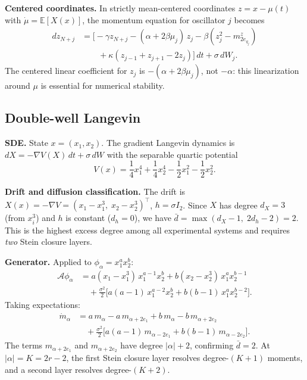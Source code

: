 \documentclass{article}
\newcommand{\E}{\mathbb{E}}
\theoremstyle{definition}
\begin{document}
\textbf{Centered coordinates.}
In strictly mean-centered coordinates $z=x-\mu(t)$ with
$\dot{\mu}=\E[X(x)]$,
the momentum equation for oscillator $j$ becomes
\begin{align}
    dz_{N+j} &= \bigl[-\gamma z_{N+j}
                - (\alpha + 2\beta\mu_j)\, z_j
                - \beta (z_j^2 - m^z_{2e_{q_j}})
    \nonumber\\
    &\quad\quad
                + \kappa(z_{j-1} + z_{j+1} - 2z_j)\bigr]\, dt
                + \sigma\, dW_j.
\end{align}
The centered linear coefficient for $z_j$ is
$-(\alpha + 2\beta\mu_j)$, not $-\alpha$:
this linearization around $\mu$ is essential for numerical stability.

\subsection{Double-well Langevin}
\label{app:double-well-generator}

\textbf{SDE.}
State $x = (x_1, x_2)$.
The gradient Langevin dynamics is
$dX = -\nabla V(X)\,dt + \sigma\,dW$
with the separable quartic potential
\begin{equation}\label{eq:double-well-potential}
    V(x) = \frac{1}{4}x_1^4 + \frac{1}{4}x_2^4
         - \frac{1}{2}x_1^2 - \frac{1}{2}x_2^2.
\end{equation}

\textbf{Drift and diffusion classification.}
The drift is
$X(x) = -\nabla V = (x_1 - x_1^3,\; x_2 - x_2^3)^\top$,
$h = \sigma I_2$.
Since $X$ has degree $d_X = 3$ (from $x_i^3$) and $h$ is constant
($d_h = 0$), we have $\bar{d} = \max(d_X - 1,\; 2d_h - 2) = 2$.
This is the highest excess degree among all experimental systems
and requires \emph{two} Stein closure layers.

\textbf{Generator.}
Applied to $\phi_\alpha = x_1^a x_2^b$:
\begin{align}\label{eq:double-well-generator}
    \mathcal{A}\phi_\alpha
    &= a(x_1 - x_1^3)\, x_1^{a-1} x_2^b
     + b(x_2 - x_2^3)\, x_1^a x_2^{b-1}
    \nonumber\\
    &\quad + \frac{\sigma^2}{2}\bigl[
      a(a{-}1)\, x_1^{a-2} x_2^b
    + b(b{-}1)\, x_1^a x_2^{b-2}\bigr].
\end{align}
Taking expectations:
\begin{align}\label{eq:double-well-moment-ode}
    \dot{m}_\alpha
    &= a\, m_\alpha - a\, m_{\alpha + 2e_1}
     + b\, m_\alpha - b\, m_{\alpha + 2e_2}
    \nonumber\\
    &\quad + \frac{\sigma^2}{2}\bigl[
      a(a{-}1)\, m_{\alpha - 2e_1}
    + b(b{-}1)\, m_{\alpha - 2e_2}\bigr].
\end{align}
The terms $m_{\alpha + 2e_1}$ and $m_{\alpha + 2e_2}$ have degree
$|\alpha| + 2$, confirming $\bar{d} = 2$.
At $|\alpha| = K = 2r{-}2$, the first Stein closure layer resolves
degree-$(K{+}1)$ moments, and a second layer resolves degree-$(K{+}2)$.
\end{document}
